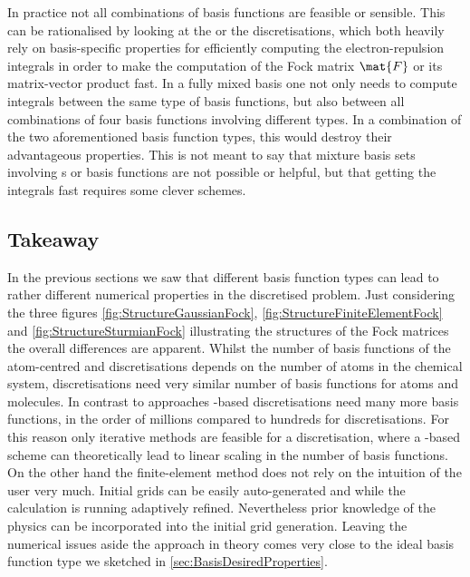 In practice not all combinations of basis functions are feasible or sensible.
This can be rationalised by looking at the {\cGTO} or the \CS discretisations,
which both heavily rely on basis-specific properties for efficiently
computing the electron-repulsion integrals
in order to make the computation of the Fock matrix $\mat{F}$
or its matrix-vector product fast.
In a fully mixed basis one not only needs to compute \ERI integrals
between the same type of basis functions,
but also between all combinations of four basis functions involving different types.
In a combination of the two aforementioned basis function types,
this would destroy their advantageous properties.
This is not meant to say that mixture basis sets involving
{\cGTO}s or {\CS} basis functions are not possible or helpful,
but that getting the integrals fast requires some clever schemes.

\subsection{Takeaway}
\label{sec:BasisTakeaway}
In the previous sections we saw that different basis function types
can lead to rather different numerical properties in the discretised \HF problem.
Just considering the three figures
\vref{fig:StructureGaussianFock},
\vref{fig:StructureFiniteElementFock}
and \vref{fig:StructureSturmianFock}
illustrating the structures of the Fock matrices
the overall differences are apparent.
Whilst the number of basis functions of the atom-centred
\cGTO and \CS discretisations depends on the number of atoms
in the chemical system,
\FE discretisations need very similar number of basis functions
for atoms and molecules.
In contrast to \ACO approaches \FE-based discretisations
need many more basis functions, in the order of millions
compared to hundreds for \ACO discretisations.
For this reason only iterative methods
are feasible for a \FE discretisation,
where a \contraction-based scheme can theoretically
lead to linear scaling in the number of basis functions.
On the other hand the finite-element method
does not rely on the intuition of the user very much.
Initial grids can be easily auto-generated and
while the calculation is running adaptively refined.
Nevertheless prior knowledge of the physics can be incorporated
into the initial grid generation.
Leaving the numerical issues aside
the \FE approach in theory comes very close to the ideal
basis function type we sketched in \vref{sec:BasisDesiredProperties}.

